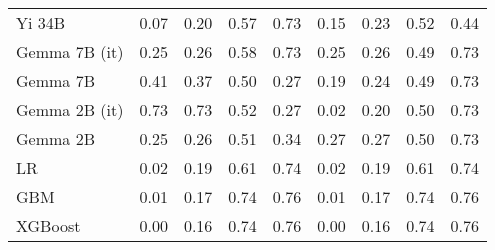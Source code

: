 \begin{tabular}{lllllllll}
Yi 34B & \cellcolor{cyan!25.0} 0.07 & \cellcolor{cyan!25.0} 0.20 & 0.57 & \cellcolor{cyan!20.7} 0.73 & 0.15 & 0.23 & 0.52 & 0.44 \\
Gemma 7B (it) & 0.25 & 0.26 & \cellcolor{cyan!25.0} 0.58 & \cellcolor{cyan!21.8} 0.73 & \cellcolor{orange!8.9} 0.25 & 0.26 & \cellcolor{orange!3.1} 0.49 & \cellcolor{cyan!22.3} 0.73 \\
Gemma 7B & 0.41 & 0.37 & \cellcolor{orange!25.0} 0.50 & \cellcolor{orange!25.0} 0.27 & 0.19 & 0.24 & 0.49 & \cellcolor{cyan!25.0} 0.73 \\
Gemma 2B (it) & \cellcolor{orange!25.0} 0.73 & \cellcolor{orange!25.0} 0.73 & 0.52 & \cellcolor{orange!25.0} 0.27 & \cellcolor{cyan!25.0} 0.02 & \cellcolor{cyan!25.0} 0.20 & 0.50 & \cellcolor{cyan!25.0} 0.73 \\
Gemma 2B & 0.25 & 0.26 & 0.51 & 0.34 & \cellcolor{orange!25.0} 0.27 & \cellcolor{orange!25.0} 0.27 & 0.50 & \cellcolor{cyan!25.0} 0.73 \\
LR & 0.02 & 0.19 & 0.61 & 0.74 & 0.02 & 0.19 & 0.61 & 0.74 \\
GBM & 0.01 & 0.17 & 0.74 & 0.76 & 0.01 & 0.17 & 0.74 & 0.76 \\
XGBoost & 0.00 & 0.16 & 0.74 & 0.76 & 0.00 & 0.16 & 0.74 & 0.76 \\
\bottomrule
\end{tabular}

